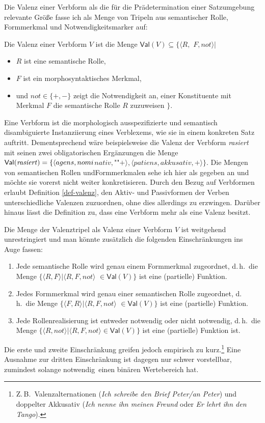 Die Valenz einer Verbform als die für die Prädetermination einer Satzumgebung relevante Grö\ss e fasse ich als Menge von Tripeln aus semantischer Rolle, Formmerkmal und Notwendigkeitsmarker auf:
\begin{definition}[Valenz] \label{def-valenz}
Die Valenz einer Verbform $V$ ist die Menge $\mathsf{Val}(V) \subseteq \{ \langle R,$ $F, not \rangle |$ 
\begin{itemize}
	\item $R$ ist eine semantische Rolle, 
	\item $F$ ist ein morphosyntaktisches Merkmal,
	\item und $not \in \{+,-\}$ zeigt die Notwendigkeit an, einer Konstituente mit Merkmal $F$ die semantische Rolle $R$ zuzuwei\-sen $\}$.
\end{itemize} 
\end{definition}
Eine Verbform ist die morphologisch ausspezifizierte und semantisch disambiguierte Instanziierung eines Verblexems, wie sie in einem konkreten Satz auftritt. Dementsprechend wäre beispielsweise die Valenz der Verbform \textit{rasiert} mit seinen zwei obligatorischen Ergänzungen die Menge $\mathsf{Val}(\text{\textit{rasiert}}) = \{\langle agens, nomi$\-$nativ, $""$+\rangle, \langle patiens, akkusativ, +\rangle\}$. Die Mengen von semantischen Rollen und\linebreak Formmerkmalen sehe ich hier als gegeben an und möchte sie vorerst nicht weiter konkretisieren. Durch den Bezug auf Verbformen erlaubt Definition \ref{def-valenz}, den Aktiv- und Passivformen der Verben unterschiedliche Valenzen zuzuordnen, ohne dies allerdings zu erzwingen. Darüber hinaus lässt die Definition zu, dass eine Verbform mehr als eine Valenz besitzt. 

Die Menge der Valenztripel als Valenz einer Verbform $V$ ist weitgehend unrestringiert und man könnte zusätzlich die folgenden Einschränkungen ins Auge fassen:\largerpage%
\begin{enumerate}\setlength{\itemsep}{-.5ex}
  \item Jede semantische Rolle wird genau einem Formmerkmal zugeordnet, d.\,h.\ die Menge $\{\langle R,F \rangle | \langle R,F,not \rangle$ $\in \mathsf{Val}(V) \}$ ist eine (partielle) Funktion.
  \item Jedes Formmerkmal wird genau einer semantischen Rolle zugeordnet, d.\,h.\ die Menge $\{\langle F,R \rangle | \langle R,F,not \rangle$ $\in \mathsf{Val}(V) \}$ ist eine (partielle) Funktion.
  \item Jede Rollenrealisierung ist entweder notwendig oder nicht notwendig, d.\,h.\ die Menge $\{\langle R, not \rangle | \langle R,F,not \rangle \in \mathsf{Val}(V) \}$ ist eine (partielle) Funktion ist.
\end{enumerate}
Die erste und zweite Einschränkung greifen jedoch empirisch zu kurz.\footnote{Z.\,B.\ Valenzalternationen (\textit{Ich schreibe den Brief Peter/an Peter}) und doppelter Akkusativ (\textit{Ich nenne ihn meinen Freund} oder \textit{Er lehrt ihn den Tango}).} Eine Ausnahme zur dritten Einschränkung ist dagegen nur schwer vorstellbar, zumindest solange \glq notwendig\grq\ einen binären Wertebereich hat. 


